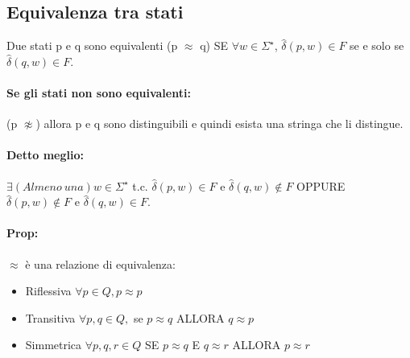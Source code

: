 \documentclass[12pt, a4paper, openany, oneside]{book}
\begin{document}
\subsection{Equivalenza tra stati}
Due stati p e q sono equivalenti (p $\approx$ q) SE $\forall w \in \Sigma^{\star}$,
$\widehat{\delta}(p, w) \in F$ se e solo se $\widehat{\delta}(q,w) \in F$.
\paragraph{Se gli stati non sono equivalenti: } (p $\not\approx$) allora p e q
sono distinguibili e quindi esista una stringa che li distingue. 
\paragraph{Detto meglio: }$\exists(Almeno~una)w \in \Sigma^{\star}$ t.c. 
$\widehat{\delta}(p,w) \in F$ e $\widehat{\delta}(q,w) \notin F$ OPPURE
$\widehat{\delta}(p,w) \notin F$ e $\widehat{\delta}(q,w) \in F$.
\paragraph{Prop: }$\approx$ è una relazione di equivalenza:
\begin{itemize}
	\item Riflessiva $\forall p \in Q, p \approx p$
	\item Transitiva $\forall p, q \in Q,$ se $p \approx q$ ALLORA $q \approx p$
	\item Simmetrica $\forall p, q, r \in Q$ SE $p \approx q$ E $q \approx r$ 
	ALLORA $p \approx r$
\end{itemize}
\end{document}
